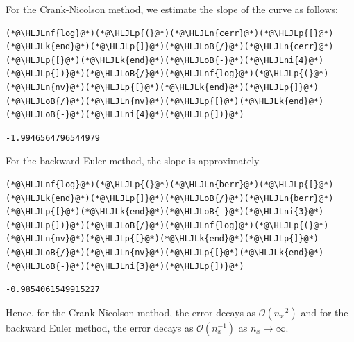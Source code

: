 \documentclass[12pt,a4paper]{article}
\newcommand{\HLJLk}[1]{\textcolor[RGB]{148,91,176}{\textbf{#1}}}
\newcommand{\HLJLn}[1]{#1}
\newcommand{\HLJLnf}[1]{\textcolor[RGB]{66,102,213}{#1}}
\newcommand{\HLJLni}[1]{\textcolor[RGB]{59,151,46}{#1}}
\newcommand{\HLJLoB}[1]{\textcolor[RGB]{102,102,102}{\textbf{#1}}}
\newcommand{\HLJLp}[1]{#1}
\begin{document}
For the Crank-Nicolson method, we estimate the slope of the curve as follows:


\begin{lstlisting}
(*@\HLJLnf{log}@*)(*@\HLJLp{(}@*)(*@\HLJLn{cerr}@*)(*@\HLJLp{[}@*)(*@\HLJLk{end}@*)(*@\HLJLp{]}@*)(*@\HLJLoB{/}@*)(*@\HLJLn{cerr}@*)(*@\HLJLp{[}@*)(*@\HLJLk{end}@*)(*@\HLJLoB{-}@*)(*@\HLJLni{4}@*)(*@\HLJLp{])}@*)(*@\HLJLoB{/}@*)(*@\HLJLnf{log}@*)(*@\HLJLp{(}@*)(*@\HLJLn{nv}@*)(*@\HLJLp{[}@*)(*@\HLJLk{end}@*)(*@\HLJLp{]}@*)(*@\HLJLoB{/}@*)(*@\HLJLn{nv}@*)(*@\HLJLp{[}@*)(*@\HLJLk{end}@*)(*@\HLJLoB{-}@*)(*@\HLJLni{4}@*)(*@\HLJLp{])}@*)
\end{lstlisting}

\begin{lstlisting}
-1.9946564796544979
\end{lstlisting}


For the backward Euler method, the slope is approximately


\begin{lstlisting}
(*@\HLJLnf{log}@*)(*@\HLJLp{(}@*)(*@\HLJLn{berr}@*)(*@\HLJLp{[}@*)(*@\HLJLk{end}@*)(*@\HLJLp{]}@*)(*@\HLJLoB{/}@*)(*@\HLJLn{berr}@*)(*@\HLJLp{[}@*)(*@\HLJLk{end}@*)(*@\HLJLoB{-}@*)(*@\HLJLni{3}@*)(*@\HLJLp{])}@*)(*@\HLJLoB{/}@*)(*@\HLJLnf{log}@*)(*@\HLJLp{(}@*)(*@\HLJLn{nv}@*)(*@\HLJLp{[}@*)(*@\HLJLk{end}@*)(*@\HLJLp{]}@*)(*@\HLJLoB{/}@*)(*@\HLJLn{nv}@*)(*@\HLJLp{[}@*)(*@\HLJLk{end}@*)(*@\HLJLoB{-}@*)(*@\HLJLni{3}@*)(*@\HLJLp{])}@*)
\end{lstlisting}

\begin{lstlisting}
-0.9854061549915227
\end{lstlisting}


Hence, for the Crank-Nicolson method, the error decays as $\mathcal{O}(n_x^{-2})$ and for the backward Euler method, the error decays as $\mathcal{O}(n_x^{-1})$ as $n_x \to \infty$.
\end{document}
